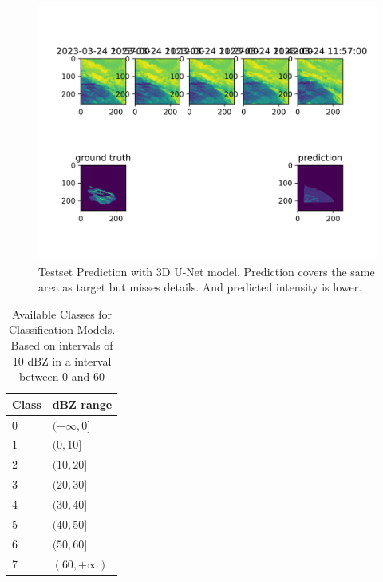 \documentclass[acmtog, screen, balance]{acmart}
\begin{document}
\begin{figure}[hbp]
  \centering
  \includegraphics[width=370pt]{./images/experiment-160.png}
  \caption{Testset Prediction with 3D U-Net model. Prediction covers the same area as target but misses details. And predicted intensity is lower.}
  \Description{}
  \label{fig:experiment-160}
\end{figure}


\begin{table}[hbp]
  \caption{Available Classes for Classification Models. Based on intervals of 10 dBZ in a interval between 0 and 60}
  \begin{tabular}{@{}ll@{}}
  \toprule
  Class & dBZ range   \\ \midrule
  0     & $(-\infty, 0]$ \\
  1     & $(0, 10]$  \\
  2     & $(10, 20]$  \\
  3     & $(20, 30]$  \\
  4     & $(30, 40]$  \\
  5     & $(40, 50]$  \\
  6     & $(50, 60]$  \\
  7     & $(60, +\infty)$  \\ \bottomrule
  \end{tabular}
  \label{tab:dbzz}
\end{table}
\end{document}
